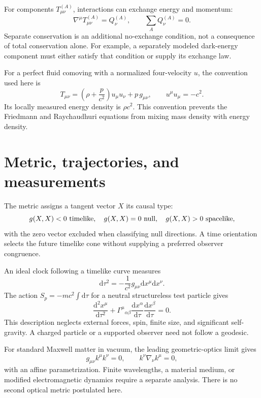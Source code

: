 \documentclass[11pt,oneside]{report}
\newcommand{\dd}{\mathrm d}
\theoremstyle{remark}
\numberwithin{definition}{chapter}
\numberwithin{proposition}{chapter}
\numberwithin{remark}{chapter}
\begin{document}
For components $T^{(A)}_{\mu\nu}$, interactions can exchange energy and momentum:
\begin{equation}
\nabla^\mu T^{(A)}_{\mu\nu}=Q^{(A)}_\nu,
\qquad \sum_A Q^{(A)}_\nu=0.
\end{equation}
Separate conservation is an additional no-exchange condition, not a consequence of total conservation alone. For example, a separately modeled dark-energy component must either satisfy that condition or supply its exchange law.

For a perfect fluid comoving with a normalized four-velocity $u$, the convention used here is
\begin{equation}
T_{\mu\nu}=\left(\rho+\frac{p}{c^2}\right)u_\mu u_\nu+p\,g_{\mu\nu},
\qquad u^\mu u_\mu=-c^2.
\end{equation}
Its locally measured energy density is $\rho c^2$. This convention prevents the Friedmann and Raychaudhuri equations from mixing mass density with energy density.

\section{Metric, trajectories, and measurements}
The metric assigns a tangent vector $X$ its causal type:
\begin{equation}
g(X,X)<0\ \hbox{timelike},\quad
g(X,X)=0\ \hbox{null},\quad
g(X,X)>0\ \hbox{spacelike},
\label{dynamics:eq:causalclassification}
\end{equation}
with the zero vector excluded when classifying null directions. A time orientation selects the future timelike cone without supplying a preferred observer congruence.

An ideal clock following a timelike curve measures
\begin{equation}
\dd\tau^2=-\frac{1}{c^2}g_{\mu\nu}\dd x^\mu\dd x^\nu.
\label{dynamics:eq:propertime}
\end{equation}
The action $S_p=-mc^2\int\dd\tau$ for a neutral structureless test particle gives
\begin{equation}
\frac{\dd^2x^\mu}{\dd\tau^2}+\Gamma^\mu{}_{\alpha\beta}
\frac{\dd x^\alpha}{\dd\tau}\frac{\dd x^\beta}{\dd\tau}=0.
\label{dynamics:eq:geodesic}
\end{equation}
This description neglects external forces, spin, finite size, and significant self-gravity. A charged particle or a supported observer need not follow a geodesic.

For standard Maxwell matter in vacuum, the leading geometric-optics limit gives
\begin{equation}
g_{\mu\nu}k^\mu k^\nu=0,\qquad k^\nu\nabla_\nu k^\mu=0,
\label{dynamics:eq:null}
\end{equation}
with an affine parametrization. Finite wavelengths, a material medium, or modified electromagnetic dynamics require a separate analysis. There is no second optical metric postulated here.
\end{document}
